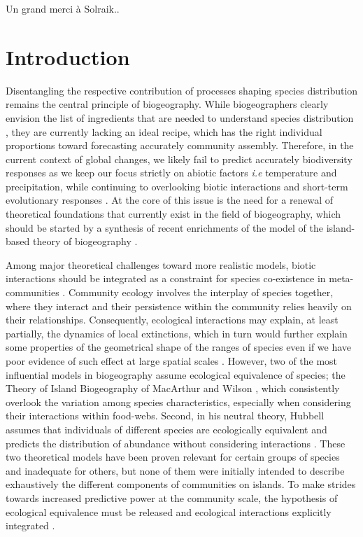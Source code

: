 Un grand merci à Solraik..
\section{Introduction}\label{introduction}

Disentangling the respective contribution of processes shaping species
distribution remains the central principle of biogeography. While
biogeographers clearly envision the list of ingredients that are needed
to understand species distribution \citep{Thuiller2013}, they are
currently lacking an ideal recipe, which has the right individual
proportions toward forecasting accurately community assembly. Therefore,
in the current context of global changes, we likely fail to predict
accurately biodiversity responses as we keep our focus strictly on
abiotic factors \emph{i.e} temperature and precipitation, while
continuing to overlooking biotic interactions and short-term
evolutionary responses \citep{Lavergne2010}. At the core of this issue
is the need for a renewal of theoretical foundations that currently
exist in the field of biogeography, which should be started by a
synthesis of recent enrichments of the model of the island-based theory
of biogeography \citep{Lomolino2000a, Warren2015}.

Among major theoretical challenges toward more realistic models, biotic
interactions should be integrated as a constraint for species
co-existence in meta-communities \citep{Jabot2012, Cazelles2015a}.
Community ecology involves the interplay of species together, where they
interact and their persistence within the community relies heavily on
their relationships. Consequently, ecological interactions may explain,
at least partially, the dynamics of local extinctions, which in turn
would further explain some properties of the geometrical shape of the
ranges of species \citep[\emph{e.g.} nested distributions of parasitoid
and its host,][]{Shenbrot2007t} even if we have poor evidence of such
effect at large spatial scales \citep[but see][]{Gotelli2010}. However,
two of the most influential models in biogeography assume ecological
equivalence of species; the Theory of Island Biogeography of MacArthur
and Wilson \citep[hereafter TIB,][]{MacArthur1967}, which consistently
overlook the variation among species characteristics, especially when
considering their interactions within food-webs. Second, in his neutral
theory, Hubbell assumes that individuals of different species are
ecologically equivalent and predicts the distribution of abundance
without considering interactions \citep{Hubbell1997}. These two
theoretical models have been proven relevant for certain groups of
species and inadequate for others, but none of them were initially
intended to describe exhaustively the different components of
communities on islands. To make strides towards increased predictive
power at the community scale, the hypothesis of ecological equivalence
must be released and ecological interactions explicitly integrated
\citep{Holt2010, Gravel2011}.

